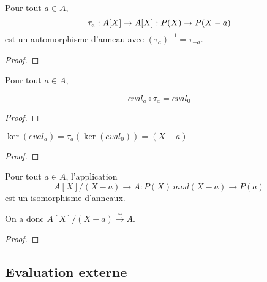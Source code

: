 \begin{proposition}
	Pour tout $a \in A$, 
	\begin{equation}
		\tau_{a} : A[X] \rightarrow A[X] : P(X) \rightarrow P(X - a)
	\end{equation}
	est un automorphisme d'anneau avec $(\tau_{a})^{-1} = \tau_{-a}$.
\end{proposition}

\ifdefined\outputproof
\begin{proof}

\end{proof}
\fi

\begin{proposition}
	Pour tout $a \in A$, 

	\begin{equation}
		eval_{a} \circ \tau_{a} = eval_{0}
	\end{equation}

\end{proposition}

\ifdefined\outputproof
\begin{proof}

\end{proof}
\fi

\begin{corollary}
	$\ker(eval_{a}) = \tau_{a}(\ker(eval_{0})) = (X - a)$
\end{corollary}

\ifdefined\outputproof
\begin{proof}

\end{proof}
\fi

\begin{proposition}
	Pour tout $a \in A$, l'application
	\begin{equation}
		A[X] / (X - a) \rightarrow A : P(X) \, mod(X - a) \rightarrow P(a)
	\end{equation}
	est un isomorphisme d'anneaux.

	On a donc $A[X] / (X - a) \xrightarrow{\sim} A$.
\end{proposition}

\ifdefined\outputproof
\begin{proof}

\end{proof}
\fi

\subsection{Evaluation externe}

